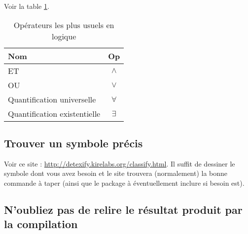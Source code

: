 \documentclass[a4paper, 11pt, oneside]{article}
\begin{document}
Voir la table \ref{table:op}.

\begin{table}[!h]
\centering
\begin{tabular}{l c}
Nom & Op \\
\hline
ET & $\land$ \\
OU & $\lor$ \\
Quantification universelle & $\forall$ \\
Quantification existentielle & $\exists$ \\
\end{tabular}
\caption{Opérateurs les plus usuels en logique}
\label{table:op}
\end{table}

\subsection{Trouver un symbole précis}

Voir ce site : \url{http://detexify.kirelabs.org/classify.html}. Il suffit de dessiner le symbole dont vous avez besoin et le site trouvera (normalement) la bonne commande à taper (ainsi que le package à éventuellement inclure si besoin est).

\subsection{N'oubliez pas de relire le résultat produit par la compilation}
\end{document}
